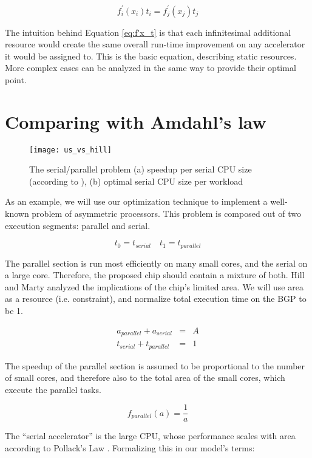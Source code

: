 \documentclass[twocolumn,english]{IEEEtran}
\begin{document}
\begin{equation}
f_{i}^{'}(x_{i})t_{i}=f_{j}^{'}(x_{j})t_{j}\label{eq:f'x_t}\end{equation}




The intuition behind Equation \eqref{eq:f'x_t} is that each infinitesimal
additional resource would create the same overall run-time improvement
on any accelerator it would be assigned to. This is the basic equation,
describing static resources. More complex cases can be analyzed in
the same way to provide their optimal point.


\section{\label{sec:Comparing}Comparing with Amdahl's law}

\begin{figure}[t]
\texttt{[image: us\_vs\_hill]}

\caption{\label{fig:us_vs_hill}The serial/parallel problem (a) speedup per
serial CPU size (according to \cite{hill2008amdahl}), (b) optimal
serial CPU size per workload}
\end{figure}


As an example, we will use our optimization technique to implement
a well-known problem of asymmetric processors. This problem is composed
out of two execution segments: parallel and serial.

\[
t_{0}=t_{serial}\quad t_{1}=t_{parallel}\]


The parallel section is run most efficiently on many small cores,
and the serial on a large core. Therefore, the proposed chip should
contain a mixture of both. Hill and Marty \cite{hill2008amdahl} analyzed
the implications of the chip\textquoteright{}s limited area. We will
use area as a resource (i.e. constraint), and normalize total execution
time on the BGP to be 1. 

\begin{eqnarray*}
a_{parallel}+a_{serial} & = & A\\
t_{serial}+t_{parallel} & = & 1\end{eqnarray*}


The speedup of the parallel section is assumed to be proportional
to the number of small cores, and therefore also to the total area
of the small cores, which execute the parallel tasks.

\[
f_{parallel}(a)=\frac{1}{a}\]


The {}``serial accelerator'' is the large CPU, whose performance
scales with area according to Pollack's Law \cite{Newmicroarchi}.
Formalizing this in our model's terms:
\end{document}
